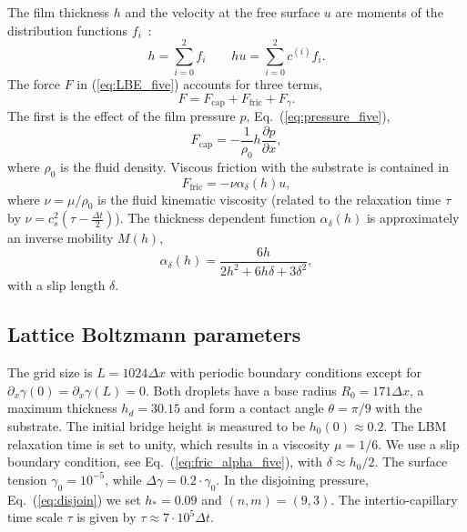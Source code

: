 The film thickness $h$ and the velocity at the free surface $u$ are moments of the distribution functions $f_i$~\cite{salmonLatticeBoltzmannMethod1999, dellarNonhydrodynamicModesPriori2002, zitzLatticeBoltzmannSimulations2021}:
\begin{equation}\label{eq:hydrofields_five}
    h= \sum_{i=0}^2 f_i \qquad hu = \sum_{i=0}^2 c^{(i)} f_i.
\end{equation}
The force $F$ in (\ref{eq:LBE_five}) accounts for three terms,
\begin{equation}\label{eq:force_five}
    F = F_{\text{cap}} + F_{\text{fric}} + F_{\gamma}.  
\end{equation}
The first is the effect of the film pressure $p$, Eq.~(\ref{eq:pressure_five}), 
\begin{equation}\label{eq:capillary_force_five}
    F_{\text{cap}} = -\frac{1}{\rho_0} h \frac{\partial p}{\partial x},
\end{equation}
where $\rho_0$ is the fluid density. 
Viscous friction with the substrate is contained in
\begin{equation}\label{eq:fric_force_five}
    F_{\text{fric}} = -\nu \alpha_{\delta}(h) u,
\end{equation}
where $\nu=\mu/\rho_0$ is the fluid kinematic viscosity (related to the relaxation time $\tau$ by $\nu = c_s^2\left(\tau-\frac{\Delta t}{2}\right)$).
The thickness dependent function $\alpha_{\delta}(h)$ is approximately an inverse mobility $M(h)$,
\begin{equation}\label{eq:fric_alpha_five}
     \alpha_{\delta}(h) = \frac{6 h}{2h^2 + 6h\delta + 3\delta^2},
\end{equation}
with a slip length $\delta$.

\subsection{Lattice Boltzmann parameters}\label{app:one}
The grid size is $L=1024\Delta x$ with periodic boundary conditions except for $\partial_x\gamma(0) = \partial_x\gamma(L) = 0$.
Both droplets have a base radius $R_0 = 171\Delta x$, a maximum thickness $h_d = 30.15$ and form a contact angle $\theta = \pi/9$ with the substrate.
The initial bridge height is measured to be $h_0(0) \approx 0.2$.
The LBM relaxation time is set to unity, which results in a viscosity $\mu = 1/6$. 
We use a slip boundary condition, see Eq.~(\ref{eq:fric_alpha_five}), with $\delta \approx h_0/2$.
The surface tension $\gamma_0 = 10^{-5}$, while $\Delta\gamma = 0.2\cdot \gamma_0$.
In the disjoining pressure, Eq.~(\ref{eq:disjoin}) we set $h_{\ast} = 0.09$ and $(n,m) = (9,3)$.
The intertio-capillary time scale $\tau$ is given by $\tau \approx 7\cdot 10^5 \Delta t$. 
